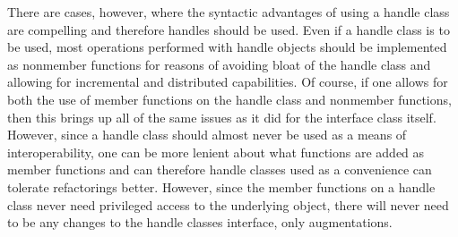 \documentclass[pdf,ps2pdf,11pt]{SANDreport}
\begin{document}
There are cases, however, where the syntactic advantages of using a handle
class are compelling and therefore handles should be used.  Even if a handle
class is to be used, most operations performed with handle objects should be
implemented as nonmember functions for reasons of avoiding bloat of the handle
class and allowing for incremental and distributed capabilities.  Of course,
if one allows for both the use of member functions on the handle class and
nonmember functions, then this brings up all of the same issues as it did for
the interface class itself.  However, since a handle class should almost never
be used as a means of interoperability, one can be more lenient about what
functions are added as member functions and can therefore handle classes used
as a convenience can tolerate refactorings better.  However, since the member
functions on a handle class never need privileged access to the underlying
object, there will never need to be any changes to the handle classes
interface, only augmentations.

%
\clearpage



%
%

\end{document}
